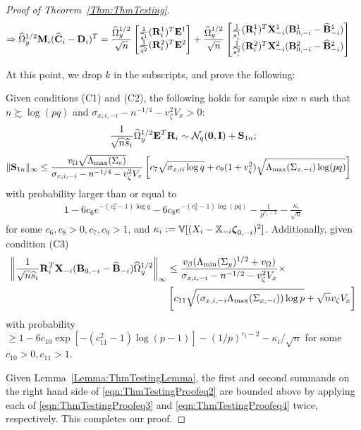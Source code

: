 \documentclass[12pt, letterpaper]{article}
\numberwithin{equation}{section}
\begin{document}
\begin{proof}[Proof of Theorem~\ref{Thm:ThmTesting}]
\begin{align}
\Rightarrow
\widehat \Omega_y^{1/2} {\mathbf{M}}_i ( \widehat {{\mathbf{C}}}_i - {\mathbf{D}}_i)^T &=
\frac{\widehat \Omega_y^{1/2}}{\sqrt n}
\begin{bmatrix}
\frac{1}{\widehat s^1} ({\mathbf{R}}^1_i)^T {\mathbf{E}}^1 \\
\frac{1}{\widehat s^2} ({\mathbf{R}}^2_i)^T {\mathbf{E}}^2
\end{bmatrix} +
\frac{\widehat \Omega_y^{1/2}}{\sqrt n}
\begin{bmatrix}
\frac{1}{\widehat s^1_i} ({\mathbf{R}}^1_i)^T {\mathbf{X}}_{-i}^1 ({\mathbf{B}}_{0,-i}^1 - \widehat {{\mathbf{B}}}_{-i}^1) \\
\frac{1}{\widehat s^2_i} ({\mathbf{R}}^2_i)^T {\mathbf{X}}_{-i}^2 ({\mathbf{B}}_{0,-i}^2 - \widehat {{\mathbf{B}}}_{-i}^2)
\end{bmatrix}\label{eqn:ThmTestingProofeq2}
\end{align}

At this point, we drop $k$ in the subscripts, and prove the following:

\begin{Lemma}\label{Lemma:ThmTestingLemma}
Given conditions (C1) and (C2), the following holds for sample size $n$ such that $n \succsim \log (pq)$ and $\sigma_{x,i,-i} - n^{-1/4} - v_\zeta^2 V_x > 0$:
%
$$
\frac{1}{\sqrt n \widehat s_i}  \widehat \Omega_y^{1/2} {\mathbf{E}}^T {\mathbf{R}}_i \sim
{\cal{N}}_q ({\bf 0}, {\mathbf{I}}) + {\mathbf{S}}_{1n};
$$
%
\begin{align}\label{eqn:ThmTestingProofeq3}
\| {\mathbf{S}}_{1n} \|_\infty & \leq 
\frac{v_\Omega \sqrt{\Lambda_{\max} (\Sigma_e) } }{\sigma_{x,i,-i} - n^{-1/4} - v_\zeta^2 V_x}
\left[ c_7 \sqrt{ \sigma_{x,ii} \log q} +
c_9  (1 + v_\zeta^2) \sqrt{\Lambda_{\max} (\Sigma_{x,-i}) \log (p q)} \right]
\end{align}
%
with probability larger than or equal to
%
\begin{align}\label{eqn:ThmTestingProofeq30}
1 - 6c_6 e^{-(c_7^2-1) \log q} - 6c_8 e^{-(c_9^2-1) \log(p q)} - \frac{1}{p^{\tau_1-2}} - 
\frac{\kappa_i}{\sqrt n}
\end{align}
%
for some $c_6, c_8 >0, c_7, c_9 > 1$, and $\kappa_i := {\mathbb{V}} [(X_i - {\mathbb{X}}_{-i} {\boldsymbol{\zeta}}_{0,-i})^2]$.
%
Additionally, given condition (C3)
%
\begin{align}\label{eqn:ThmTestingProofeq4}
\left\| \frac{1}{\sqrt n \widehat s_i} {\mathbf{R}}_i^T {\mathbf{X}}_{-i} ({\mathbf{B}}_{0,-i} - \widehat {{\mathbf{B}}}_{-i})
\widehat \Omega_y^{1/2} \right\|_\infty & \leq
\frac{v_\beta ( \Lambda_{\min} (\Sigma_y)^{1/2} + v_\Omega)}{\sigma_{x,i,-i} - n^{-1/2} - v_\zeta^2 V_x} \times \notag\\
& \left[ c_{11} \sqrt{ (\sigma_{x,i,-i} \Lambda_{\max} (\Sigma_{x, -i}) ) \log p} + \sqrt n v_\zeta V_x \right]
\end{align}
%
with probability $\geq 1 - 6c_{10} \exp [-(c_{11}^2-1) \log (p-1)] - (1/p)^{\tau_1-2} - \kappa_i/ \sqrt n$ for some $c_{10} >0, c_{11} > 1$.
\end{Lemma}

Given Lemma~\ref{Lemma:ThmTestingLemma}, the first and second summands on the right hand side of \eqref{eqn:ThmTestingProofeq2} are bounded above by applying each of \eqref{eqn:ThmTestingProofeq3} and \eqref{eqn:ThmTestingProofeq4} twice, respectively. This completes our proof.
\end{proof}
\end{document}
